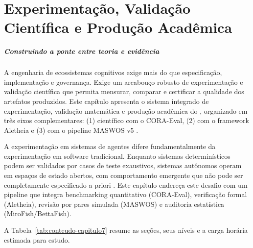 \chapter{Experimentação, Validação Científica e Produção Acadêmica}
\label{cap:experimentacao-validacao}

\paragraph{Construindo a ponte entre teoria e evidência} A engenharia de ecossistemas cognitivos exige mais do que
especificação, implementação e governança. Exige um arcabouço robusto
de experimentação e validação científica que permita mensurar,
comparar e certificar a qualidade dos artefatos produzidos. Este
capítulo apresenta o sistema integrado de experimentação, validação
matemática e produção acadêmica do \opencodeeco{}, organizado em
três eixos complementares: (1)  científico
com o CORA-Eval, (2)  com o framework
Aletheia e (3)  com o pipeline MASWOS v5
\cite{opencode2026spec043, opencode2026ecosystem}.

A experimentação em sistemas de agentes difere fundamentalmente da
experimentação em software tradicional. Enquanto sistemas
determinísticos podem ser validados por casos de teste exaustivos,
sistemas autônomos operam em espaços de estado abertos, com
comportamento emergente que não pode ser completamente especificado
a priori \cite{wooldridge2009multiagent, russell2020inteligencia}.
Este capítulo endereça este desafio com um pipeline que integra
benchmarking quantitativo (CORA-Eval), verificação formal (Aletheia),
revisão por pares simulada (MASWOS) e auditoria estatística
(MiroFish/BettaFish).

A Tabela~\ref{tab:conteudo-capitulo7} resume as seções, seus níveis
e a carga horária estimada para estudo.

